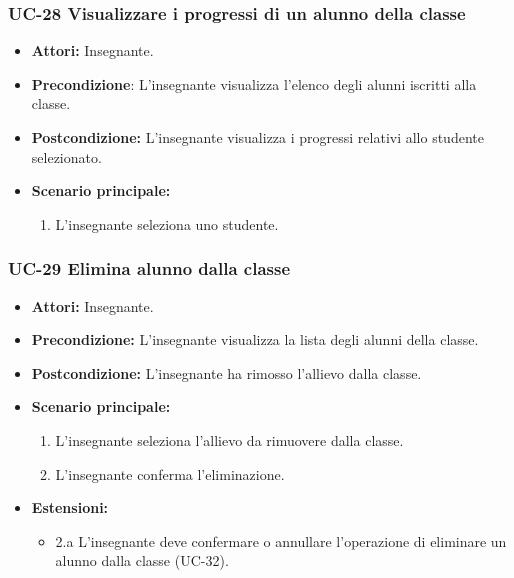 \subsubsection{UC-28 Visualizzare i progressi di un alunno della classe}
\begin{itemize}
	\item \textbf{Attori:} Insegnante.
	\item \textbf{Precondizione}: L'insegnante visualizza l'elenco degli alunni iscritti alla classe.
	\item \textbf{Postcondizione:} L'insegnante visualizza i progressi relativi allo studente selezionato.
	\item \textbf{Scenario principale:}
	\begin{enumerate}
		\item L'insegnante seleziona uno studente. 
	\end{enumerate}
\end{itemize}

\subsubsection{UC-29 Elimina alunno dalla classe}		
\begin{itemize}
	\item \textbf{Attori:} Insegnante.
	\item \textbf{Precondizione:} L'insegnante visualizza la lista degli alunni della classe.
	\item \textbf{Postcondizione:} L'insegnante ha rimosso l'allievo dalla classe.
	\item \textbf{Scenario principale:}
	\begin{enumerate}
		\item L'insegnante seleziona l'allievo da rimuovere dalla classe.
		\item L'insegnante conferma l'eliminazione.
	\end{enumerate}	
\item \textbf{Estensioni:}
\begin{itemize}
	\item 2.a L'insegnante deve confermare o annullare l'operazione di eliminare un alunno dalla classe (UC-32).
\end{itemize}	
\end{itemize}

